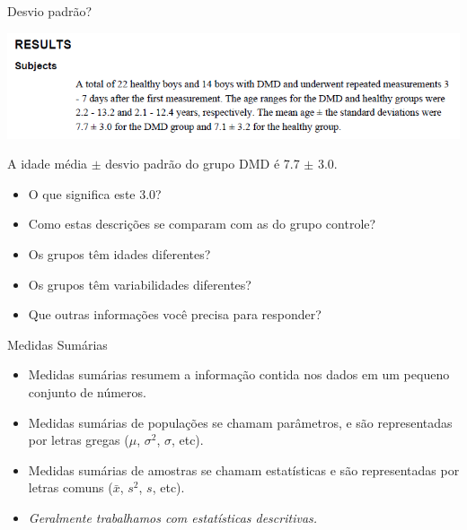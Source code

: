 \documentclass{beamer}
\begin{document}
\begin{frame}{\scriptsize Desvio padrão?}
  \begin{center}
    \includegraphics[width=1\textwidth]{Cap3/DP2}
  \end{center}

  \begin{block}{}
    \footnotesize
    A idade média $\pm$ desvio padrão do grupo DMD é 7.7 $\pm$ 3.0.
    \bigskip
    \begin{itemize}
      \scriptsize
    \item O que significa este 3.0?
      \medskip
    \item Como estas descrições se comparam com as do grupo controle?
      \medskip
    \item \alert{Os grupos têm idades diferentes?}
      \medskip
    \item \alert{Os grupos têm variabilidades diferentes?}
      \medskip
    \item Que outras informações você precisa para responder?
    \end{itemize}
  \end{block}
\end{frame}

\begin{frame}{\scriptsize Medidas Sumárias}
  \begin{itemize}
    \footnotesize
  \item<1,4> Medidas sumárias resumem a informação contida nos dados em um
    pequeno conjunto de números.
    \bigskip
  \item<2,3> Medidas sumárias de \alert{populações} se chamam
    \alert{parâmetros}, e são representadas por letras gregas ($\mu$, $\sigma^2$, $\sigma$, etc).
    \bigskip
  \item<3> Medidas sumárias de \alert{amostras} se chamam \alert{estatísticas} e são representadas por letras comuns ($\bar{x}$, $s^2$, $s$, etc).
    \bigskip
  \item<4> {\em Geralmente trabalhamos com estatísticas descritivas.}
  \end{itemize}
\end{frame}
\end{document}
